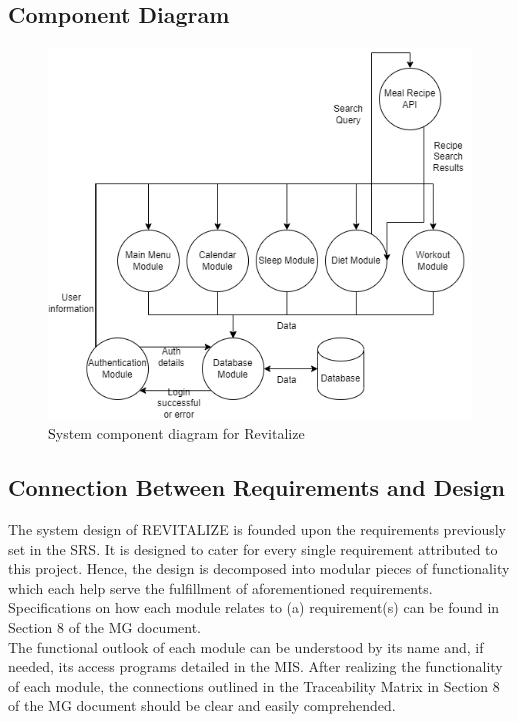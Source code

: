 \documentclass[12pt, titlepage]{article}
\begin{document}
	\subsection{Component Diagram}
	\begin{figure}[H]
	\centering
	\includegraphics[scale=0.7]{system_diagrams/SystemComponentDiagram.png}
	\caption{\textcolor{black} System component diagram for Revitalize}
\end{figure}
	\subsection{Connection Between Requirements and Design} \label{SecConnection}
	
	The system design of REVITALIZE is founded upon the requirements previously set in the SRS. It is designed to cater for every single requirement attributed to this project. Hence, the design is decomposed into modular pieces of functionality which each help serve the fulfillment of aforementioned requirements. Specifications on how each module relates to (a) requirement(s) can be found in Section 8 of the MG document.\\
The functional outlook of each module can be understood by its name and, if needed, its access programs detailed in the MIS. After realizing the functionality of each module, the connections outlined in the Traceability Matrix in Section 8 of the MG document should be clear and easily comprehended.
	
\end{document}
